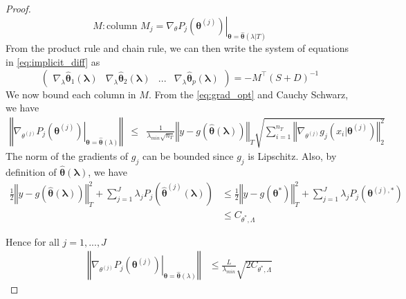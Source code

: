 \documentclass[12pt]{article}
\begin{document}
\begin{proof}
	
	\[
	M: \text{column } M_j = \left. \nabla_{\theta}P_{j}(\boldsymbol{\theta}^{(j)})
	\right|_{\boldsymbol{\theta}=\hat{\boldsymbol{\theta}}(\lambda|T)}
	\]
	From the product rule and chain rule, we can then write the system of equations in \eqref{eq:implicit_diff} as
	\begin{equation}
	\label{eq:param_matrix}
	\left(\begin{array}{cccc}
	\nabla_{\lambda}\hat{\boldsymbol{\theta}}_{1}(\boldsymbol{\lambda}) & \nabla_{\lambda}\hat{\boldsymbol{\theta}}_{2}(\boldsymbol{\lambda}) & ... & \nabla_{\lambda}\hat{\boldsymbol{\theta}}_{p}(\boldsymbol{\lambda})\end{array}\right)=-M^{\top}\left(S+D\right)^{-1}
	\end{equation}
	We now bound each column in $M$. From the \eqref{eq:grad_opt} and Cauchy Schwarz, we have 
	\begin{eqnarray*}
		\left\Vert \left.\nabla_{\theta^{(j)}}P_{j}(\boldsymbol{\theta}^{(j)})\right|_{\boldsymbol{\theta}=\hat{\boldsymbol{\theta}}(\lambda)}\right\Vert  & \le & \frac{1}{\lambda_{min}\sqrt{n_{T}}}\left\Vert y-g(\hat{\boldsymbol{\theta}}(\boldsymbol{\lambda}))\right\Vert _{T}\sqrt{\sum_{i=1}^{n_{T}}\left\Vert \nabla_{\theta^{(j)}}g_{j}(x_{i}|\boldsymbol{\theta}^{(j)})\right\Vert _{2}^{2}}		
	\end{eqnarray*}
	The norm of the gradients of $g_j$ can be bounded since $g_j$ is Lipschitz. Also, by definition of $\hat{\boldsymbol{\theta}}(\boldsymbol{\lambda})$, we have
	\begin{align*}
	\frac{1}{2}\left\Vert y-g(\hat{\boldsymbol{\theta}}(\boldsymbol{\lambda}))\right\Vert _{T}^{2}+\sum_{j=1}^{J}\lambda_{j}P_{j}\left(\hat{\boldsymbol{\theta}}^{(j)}(\boldsymbol{\lambda})\right) & \le \frac{1}{2}\left\Vert y-g(\boldsymbol{\theta}^{*})\right\Vert _{T}^{2}+\sum_{j=1}^{J}\lambda_{j}P_{j}(\boldsymbol{\theta}^{(j),*})\\
	& \le C_{\theta^{*},\Lambda}
	\end{align*}
	
	Hence for all $j=1,...,J$
	\begin{align}
	\left\Vert \left.\nabla_{\theta^{(j)}}P_{j}(\boldsymbol{\theta}^{(j)})\right|_{\boldsymbol{\theta}=\hat{\boldsymbol{\theta}}(\lambda)}\right\Vert  & \le \frac{L}{\lambda_{min}}\sqrt{2C_{\theta^{*},\Lambda}}
	\end{align}
	

\end{proof}
\end{document}
